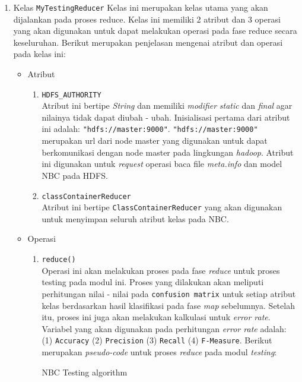 \begin{enumerate}
	\item Kelas \texttt{MyTestingReducer}
	Kelas ini merupakan kelas utama yang akan dijalankan pada proses reduce. Kelas ini memiliki 2 atribut dan 3 operasi yang akan digunakan untuk dapat melakukan operasi pada fase reduce secara keseluruhan. Berikut merupakan penjelasan mengenai atribut dan operasi pada kelas ini:
	\begin{itemize}
		\item{Atribut}
		\begin{enumerate}
			\item{\verb|HDFS_AUTHORITY|}\\
			Atribut ini bertipe \textit{String} dan memiliki \textit{modifier} \textit{static} dan \textit{final} agar nilainya tidak dapat diubah - ubah. Inisialisasi pertama dari atribut ini adalah: \verb|"hdfs://master:9000"|. \verb|"hdfs://master:9000"| merupakan url dari node master yang digunakan untuk dapat berkomunikasi dengan node master pada lingkungan \textit{hadoop}. Atribut ini digunakan untuk \textit{request} operasi baca file \textit{meta.info} dan model NBC pada HDFS.
		
			\item{\texttt{classContainerReducer}}\\
			Atribut ini bertipe \texttt{ClassContainerReducer} yang akan digunakan untuk menyimpan seluruh atribut kelas pada NBC. 
			
		\end{enumerate}
		
		\item{Operasi}
		\begin{enumerate}
			\item{\texttt{reduce()}}\\
			Operasi ini akan melakukan proses pada fase \textit{reduce} untuk proses testing pada modul ini. Proses yang dilakukan akan meliputi perhitungan nilai - nilai pada \texttt{confusion matrix} untuk setiap atribut kelas berdasarkan hasil klasifikasi pada fase \textit{map} sebelumnya. Setelah itu, proses ini juga akan melakukan kalkulasi untuk \textit{error rate}. Variabel yang akan digunakan pada perhitungan \textit{error rate} adalah: (1) \texttt{Accuracy} (2) \texttt{Precision} (3) \texttt{Recall} (4) \texttt{F-Measure}. Berikut merupakan \textit{pseudo-code} untuk proses \textit{reduce} pada modul \textit{testing}:
			\begin{algorithm}[H]
			\caption{NBC Testing algorithm}\label{alg:NBCTestMap}
			\begin{algorithmic}[1]
			

\end{algorithmic}
\end{algorithm}
\end{enumerate}
\end{itemize}
\end{enumerate}
